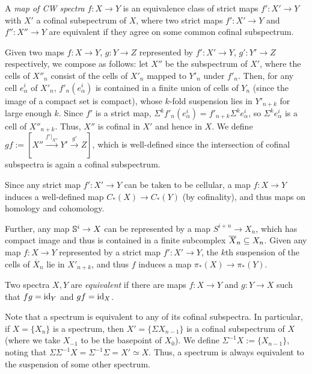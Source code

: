 \documentclass{MetricNotes2023}
\def\bb{\ensuremath\mathbb}
\def\subq{\ensuremath\subseteq}
\def\id{\ensuremath\text{id}}
\begin{document}
\begin{definition}
A \textit{map of CW spectra} \(f : X \to Y\) is an equivalence class of strict maps \(f' : X' \to Y\) with \(X'\) a cofinal subspectrum of \(X\), where two strict maps \(f' : X' \to Y\) and \(f'' : X'' \to Y\) are equivalent if they agree on some common cofinal subspectrum. 
\end{definition}

Given two maps \(f : X \to Y\), \(g : Y \to Z\) represented by \(f' : X' \to Y\), \(g' : Y' \to Z\) respectively, we compose as follows: let \(X''\) be the subspectrum of \(X'\), where the cells of \(X''_n\) consist of the cells of \(X'_n\) mapped to \(Y'_n\) under \(f'_n\). Then, for any cell \(e^i_\alpha\) of \(X'_n\), \(f'_n(e^i_\alpha)\) is contained in a finite union of cells of \(Y_n\) (since the image of a compact set is compact), whose \(k\)-fold suspension lies in \(Y'_{n+k}\) for large enough \(k\). Since \(f'\) is a strict map, \(\Sigma^kf'_n(e^i_\alpha)=f'_{n+k}\Sigma^ke^i_\alpha\), so \(\Sigma^ke^i_\alpha\) is a cell of \(X''_{n+k}\). Thus, \(X''\) is cofinal in \(X'\) and hence in \(X\). We define \(gf := [X'' \xrightarrow{f'|_{X''}}Y' \xrightarrow{g'}Z]\), which is well-defined since the intersection of cofinal subspectra is again a cofinal subspectrum. 

Since any strict map \(f' : X' \to Y\) can be taken to be cellular, a map \(f : X \to Y\) induces a well-defined map \(C_*(X)\to C_*(Y)\) (by cofinality), and thus maps on homology and cohomology. 

Further, any map \(\bb{S}^i\to X\) can be represented by a map \(S^{i+n}\to X_n\), which has compact image and thus %
is contained in a finite subcomplex \(\overline X_n\subq X_n\). Given any map \(f : X \to Y\) represented by a strict map \(f' : X' \to Y\), the \(k\)th suspension of the cells of \(\overline X_n\) lie in \(X'_{n+k}\), and thus \(f\) induces a map \(\pi_*(X) \to \pi_*(Y)\). %

\begin{definition}
Two spectra \(X, Y\) are \textit{equivalent} if there are maps \(f : X \to Y\) and \(g : Y \to X\) such that \(fg=\id_{Y}\) and \(gf=\id_X\).
\end{definition}


Note that a spectrum is equivalent to any of its cofinal subspectra. In particular, if \(X=\{X_n\}\) is a spectrum, then \(X'=\{\Sigma X_{n-1}\}\) is a cofinal subspectrum of \(X\) (where we take \(X_{-1}\) to be the basepoint of \(X_0\)). We define \(\Sigma^{-1}X:=\{X_{n-1}\}\), noting that \(\Sigma \Sigma^{-1}X=\Sigma^{-1}\Sigma=X'\simeq X\). Thus, a spectrum is always equivalent to the suspension of some other spectrum.
\end{document}
